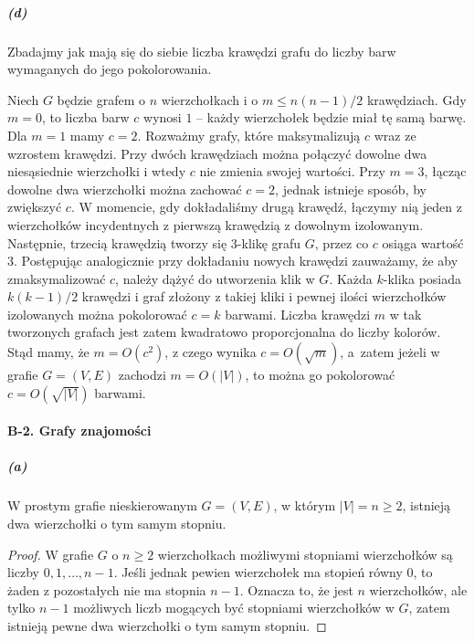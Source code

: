 \subparagraph{(d)}
Zbadajmy jak mają się do siebie liczba krawędzi grafu do liczby barw wymaganych do jego pokolorowania.

Niech $G$ będzie grafem o $n$ wierzchołkach i o $m\le n(n-1)/2$ krawędziach. Gdy $m=0$, to liczba barw $c$ wynosi $1$ -- każdy wierzchołek będzie miał tę samą barwę. Dla $m=1$ mamy $c=2$. Rozważmy grafy, które maksymalizują $c$ wraz ze wzrostem krawędzi. Przy dwóch krawędziach można połączyć dowolne dwa niesąsiednie wierzchołki i wtedy $c$ nie zmienia swojej wartości. Przy $m=3$, łącząc dowolne dwa wierzchołki można zachować $c=2$, jednak istnieje sposób, by zwiększyć $c$. W momencie, gdy dokładaliśmy drugą krawędź, łączymy nią jeden z wierzchołków incydentnych z pierwszą krawędzią z dowolnym izolowanym. Następnie, trzecią krawędzią tworzy się $3$-klikę grafu $G$, przez co $c$ osiąga wartość $3$. Postępując analogicznie przy dokładaniu nowych krawędzi zauważamy, że aby zmaksymalizować $c$, należy dążyć do utworzenia klik w $G$. Każda $k$-klika posiada $k(k-1)/2$ krawędzi i graf złożony z takiej kliki i pewnej ilości wierzchołków izolowanych można pokolorować $c=k$ barwami. Liczba krawędzi $m$ w tak tworzonych grafach jest zatem kwadratowo proporcjonalna do liczby kolorów. Stąd mamy, że $m=O(c^2)$, z czego wynika $c=O\left(\sqrt{m}\right)$, a~zatem jeżeli w grafie $G=(V,E)$ zachodzi $m=O(|V|)$, to można go pokolorować $c=O\left(\sqrt{|V|}\right)$ barwami.

\paragraph{B-2. Grafy znajomości}
\subparagraph{(a)}
\begin{twierdzenie*}
	W prostym grafie nieskierowanym $G=(V,E)$, w którym $|V|=n\ge 2$, istnieją dwa wierzchołki o tym samym stopniu.
\end{twierdzenie*}
\begin{proof}
W grafie $G$ o $n\ge 2$ wierzchołkach możliwymi stopniami wierzchołków są liczby $0,1,\dots,n-1$. Jeśli jednak pewien wierzchołek ma stopień równy $0$, to żaden z pozostałych nie ma stopnia $n-1$. Oznacza to, że jest $n$ wierzchołków, ale tylko $n-1$ możliwych liczb mogących być stopniami wierzchołków w $G$, zatem istnieją pewne dwa wierzchołki o tym samym stopniu.
\end{proof}

